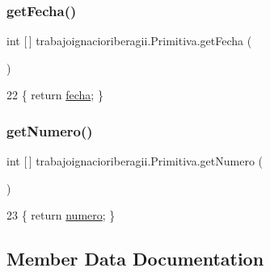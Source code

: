 \subsubsection{\texorpdfstring{get\+Fecha()}{getFecha()}}
{\footnotesize\ttfamily int \mbox{[}$\,$\mbox{]} trabajoignacioriberagii.\+Primitiva.\+get\+Fecha (\begin{DoxyParamCaption}{ }\end{DoxyParamCaption})\hspace{0.3cm}{\ttfamily [inline]}}


\begin{DoxyCode}
22 \{ \textcolor{keywordflow}{return} \mbox{\hyperlink{classtrabajoignacioriberagii_1_1_primitiva_aed579bc382e7b2690693c47175ee5ba7}{fecha}};  \}
\end{DoxyCode}
\mbox{\label{classtrabajoignacioriberagii_1_1_primitiva_aad3bcddbc88a37caff530abeb09322a6}} 
\subsubsection{\texorpdfstring{get\+Numero()}{getNumero()}}
{\footnotesize\ttfamily int \mbox{[}$\,$\mbox{]} trabajoignacioriberagii.\+Primitiva.\+get\+Numero (\begin{DoxyParamCaption}{ }\end{DoxyParamCaption})\hspace{0.3cm}{\ttfamily [inline]}}


\begin{DoxyCode}
23 \{ \textcolor{keywordflow}{return} \mbox{\hyperlink{classtrabajoignacioriberagii_1_1_primitiva_a950834ca537595189c226c313d28341b}{numero}};  \}
\end{DoxyCode}


\subsection{Member Data Documentation}
\mbox{\label{classtrabajoignacioriberagii_1_1_primitiva_aed579bc382e7b2690693c47175ee5ba7}} 
